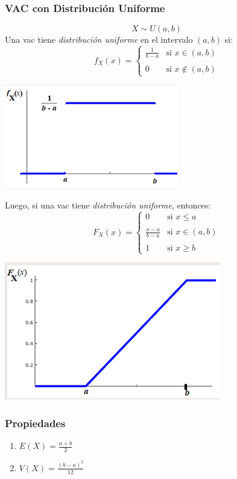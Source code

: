 \documentclass{article}
\begin{document}
\subsubsection{VAC con Distribución Uniforme}
\begin{equation*}
    X \sim U(a,b)
\end{equation*}
Una vac tiene \emph{distribución uniforme} en el intervalo $(a,b)$ si:
\begin{equation*}
    f_X(x) =\left\{ \begin{array}{lcc}
             \frac{1}{b-a}&  \text{si } x \in (a,b) \\
             \\ 0 & \text{si } x \notin (a,b)
             \end{array}
   \right.
\end{equation*}
\begin{center}
        \includegraphics[width=.30\textwidth]{Images/VACUnif.png}
    \end{center} 
Luego, si una vac tiene \emph{distribución uniforme}, entonces:
\begin{equation*}
    F_X(x) =\left\{ \begin{array}{lcc}
             0&  \text{si } x \leq a \\
             \\ \frac{x-a}{b-a}& \text{si } x \in (a,b) \\
             \\ 1& \text{si } x \geq b
             \end{array}
   \right.
\end{equation*}
\begin{center}
        \includegraphics[width=.30\textwidth]{Images/VACUnif2.png}
    \end{center} 
\subsubsection*{Propiedades}
\begin{enumerate}
    \item $E(X) = \frac{a+b}{2}$
    \item $V(X) = \frac{(b-a)^2}{12}$
\end{enumerate}
\end{document}

